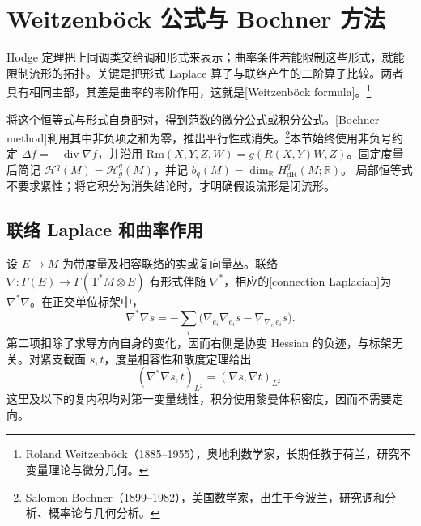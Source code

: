 
% 
% 

\section{Weitzenböck 公式与 Bochner 方法}
\label{g3:sec:1503}

Hodge 定理把上同调类交给调和形式来表示；曲率条件若能限制这些形式，就能限制流形的拓扑。关键是把形式 Laplace 算子与联络产生的二阶算子比较。两者具有相同主部，其差是曲率的零阶作用，这就是[Weitzenböck formula]。\footnote{Roland Weitzenböck（1885--1955），奥地利数学家，长期任教于荷兰，研究不变量理论与微分几何。}

\ProseParagraphBreak

将这个恒等式与形式自身配对，得到范数的微分公式或积分公式。[Bochner method]利用其中非负项之和为零，推出平行性或消失。\footnote{Salomon Bochner（1899--1982），美国数学家，出生于今波兰，研究调和分析、概率论与几何分析。}本节始终使用非负号约定
\(\Delta f=-\operatorname{div}\nabla f\)，并沿用
\(\mathrm{Rm}(X,Y,Z,W)=g(R(X,Y)W,Z)\)。固定度量后简记
\(\mathcal H^q(M)=\mathcal H_g^q(M)\)，并记
\(b_q(M)=\dim_{\mathbb R}H_{\mathrm{dR}}^q(M;\mathbb R)\)。
局部恒等式不要求紧性；将它积分为消失结论时，才明确假设流形是闭流形。

\subsection{联络 Laplace 和曲率作用}
\label{g3:subsec:1503:01}
设 \(E\to M\) 为带度量及相容联络的实或复向量丛。联络
\(\nabla:\Gamma(E)\to\Gamma(\mathrm T^*M\otimes E)\)
有形式伴随 \(\nabla^*\)，相应的[connection Laplacian]为
\(\nabla^*\nabla\)。在正交单位标架中，
\begin{equation}\label{g3:eq:rough-laplacian-local}
	\nabla^*\nabla s
	=-\sum_i\bigl(\nabla_{e_i}\nabla_{e_i}s
	                  -\nabla_{\nabla_{e_i}e_i}s\bigr).
\end{equation}
第二项扣除了求导方向自身的变化，因而右侧是协变 Hessian 的负迹，与标架无关。对紧支截面 \(s,t\)，度量相容性和散度定理给出
\[
	(\nabla^*\nabla s,t)_{L^2}=(\nabla s,\nabla t)_{L^2}.
\]
这里及以下的复内积均对第一变量线性，积分使用黎曼体积密度，因而不需要定向。

